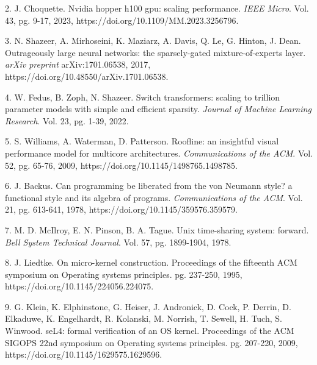 \documentclass[12pt]{article}
\begin{document}
2. J. Choquette. Nvidia hopper h100 gpu: scaling performance. \textit{IEEE Micro}. Vol. 43, pg. 9-17, 2023, https:/\allowbreak{}/\allowbreak{}doi.org/\allowbreak{}10.1109/\allowbreak{}MM.2023.3256796.

3. N. Shazeer, A. Mirhoseini, K. Maziarz, A. Davis, Q. Le, G. Hinton, J. Dean. Outrageously large neural networks: the sparsely-gated mixture-of-experts layer. \textit{arXiv preprint} arXiv:1701.06538, 2017, https:/\allowbreak{}/\allowbreak{}doi.org/\allowbreak{}10.48550/\allowbreak{}arXiv.1701.06538.

4. W. Fedus, B. Zoph, N. Shazeer. Switch transformers: scaling to trillion parameter models with simple and efficient sparsity. \textit{Journal of Machine Learning Research}. Vol. 23, pg. 1-39, 2022.

5. S. Williams, A. Waterman, D. Patterson. Roofline: an insightful visual performance model for multicore architectures. \textit{Communications of the ACM}. Vol. 52, pg. 65-76, 2009, https:/\allowbreak{}/\allowbreak{}doi.org/\allowbreak{}10.1145/\allowbreak{}1498765.1498785.

6. J. Backus. Can programming be liberated from the von Neumann style? a functional style and its algebra of programs. \textit{Communications of the ACM}. Vol. 21, pg. 613-641, 1978, https:/\allowbreak{}/\allowbreak{}doi.org/\allowbreak{}10.1145/\allowbreak{}359576.359579.

7. M. D. McIlroy, E. N. Pinson, B. A. Tague. Unix time-sharing system: forward. \textit{Bell System Technical Journal}. Vol. 57, pg. 1899-1904, 1978.

8. J. Liedtke. On micro-kernel construction. Proceedings of the fifteenth ACM symposium on Operating systems principles. pg. 237-250, 1995, https:/\allowbreak{}/\allowbreak{}doi.org/\allowbreak{}10.1145/\allowbreak{}224056.224075.

9. G. Klein, K. Elphinstone, G. Heiser, J. Andronick, D. Cock, P. Derrin, D. Elkaduwe, K. Engelhardt, R. Kolanski, M. Norrish, T. Sewell, H. Tuch, S. Winwood. seL4: formal verification of an OS kernel. Proceedings of the ACM SIGOPS 22nd symposium on Operating systems principles. pg. 207-220, 2009, https:/\allowbreak{}/\allowbreak{}doi.org/\allowbreak{}10.1145/\allowbreak{}1629575.1629596.
\end{document}

